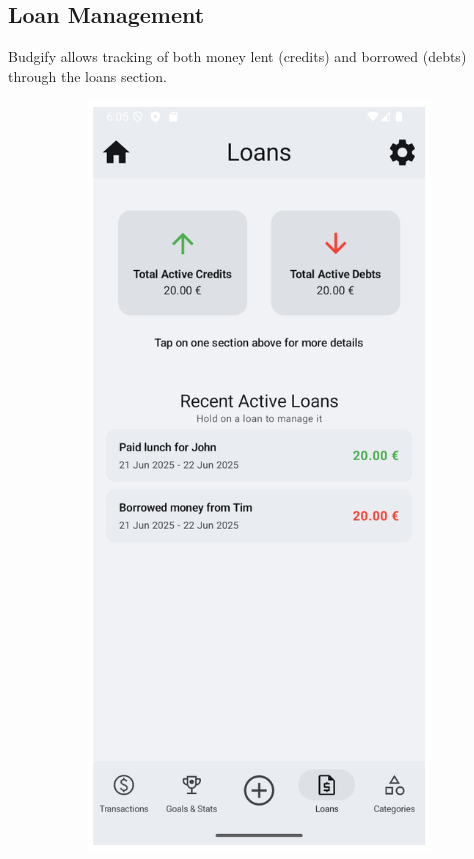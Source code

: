 \documentclass[a4paper,12pt]{article}
\begin{document}
\subsection{Loan Management}
Budgify allows tracking of both money lent (credits) and borrowed (debts) through the loans section.

\begin{figure}[H]
    \centering
    \begin{subfigure}[b]{0.23\textwidth}
        \includegraphics[width=\textwidth]{loans.png}

\end{subfigure}
\end{figure}
\end{document}
